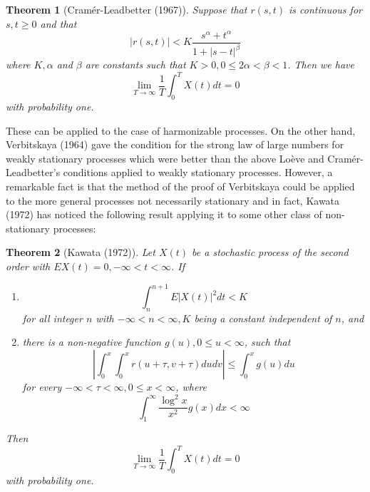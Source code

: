 \documentclass{article}
\newtheorem{theorem}{Theorem}
\newtheorem{enumerate}{Enumerate}
\begin{document}
\begin{theorem}[Cramér-Leadbetter (1967)]\label{thm:B}
Suppose that $r(s,t)$ is continuous for $s,t \geq 0$ and that
\begin{equation}\label{eq:13}
|r(s,t)|<K \frac{s^{\alpha}+t^{\alpha}}{1+|s-t|^{\beta}}
\end{equation}
where $K, \alpha$ and $\beta$ are constants such that $K>0, 0 \leq 2\alpha < \beta < 1$. Then we have
\begin{equation}\label{eq:14}
\lim_{T \rightarrow \infty} \frac{1}{T} \int_{0}^{T} X(t) dt=0
\end{equation}
with probability one.
\end{theorem}

These can be applied to the case of harmonizable processes. On the other hand, Verbitskaya (1964) gave the condition for the strong law of large numbers for weakly stationary processes which were better than the above Loève and Cramér-Leadbetter's conditions applied to weakly stationary processes. However, a remarkable fact is that the method of the proof of Verbitskaya could be applied to the more general processes not necessarily stationary and in fact, Kawata (1972) has noticed the following result applying it to some other class of non-stationary processes:

\begin{theorem}[Kawata (1972)]\label{thm:C}
Let $X(t)$ be a stochastic process of the second order with $EX(t)=0, -\infty < t < \infty$. If

\begin{enumerate}
\item 
\begin{equation}\label{eq:15}
\int_{n}^{n+1} E|X(t)|^{2} dt<K
\end{equation}
for all integer $n$ with $-\infty < n < \infty, K$ being a constant independent of $n$, and

\item there is a non-negative function $g(u), 0 \leq u < \infty$, such that
\begin{equation}\label{eq:16}
\left|\int_{0}^{x} \int_{0}^{x} r(u+\tau, v+\tau) dudv\right| \leq \int_{0}^{x} g(u) du
\end{equation}
for every $-\infty < \tau < \infty, 0 \leq x < \infty$, where
\begin{equation}\label{eq:17}
\int_{1}^{\infty} \frac{\log^{2} x}{x^{2}} g(x) dx < \infty
\end{equation}
\end{enumerate}

Then
\begin{equation}\label{eq:18}
\lim_{T \rightarrow \infty} \frac{1}{T} \int_{0}^{T} X(t) dt=0
\end{equation}
with probability one.
\end{theorem}
\end{document}
